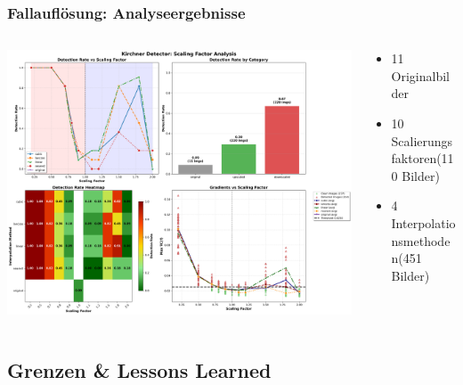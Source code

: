 \documentclass[11pt,t,usepdftitle=false,aspectratio=169]{beamer}
\begin{document}
\begin{frame}
	\frametitle{Fallauflösung: Analyseergebnisse}
	\begin{columns}[T]
		\begin{column}{0.6\textwidth}
			\includegraphics[width=\textwidth]{images/scaling_analysis_report_full.png}
		\end{column}
		\begin{column}{0.40\textwidth}
			\begin{itemize}
				\item 11 Originalbilder
				\item 10 Scalierungsfaktoren(110 Bilder)
				\item 4 Interpolationsmethoden(451 Bilder)
			\end{itemize}
		\end{column}
	\end{columns}
\end{frame}

\subsection{Grenzen \& Lessons Learned}
\end{document}
